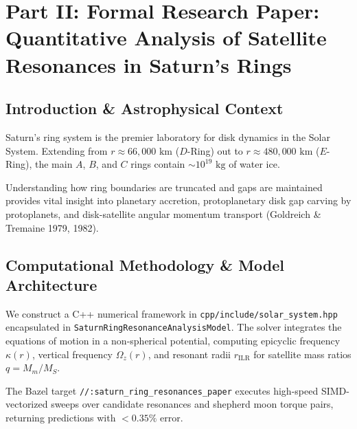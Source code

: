 \documentclass[11pt,a4paper]{article}
\begin{document}
\section*{Part II: Formal Research Paper: Quantitative Analysis of Satellite Resonances in Saturn's Rings}

\begin{abstract}
We perform a quantitative astrophysical analysis of Saturn's ring structure using radio science (RSS) and optical/near-infrared (VIMS) occultation datasets collected during the Cassini orbital mission (2004--2017). We formulate a C++ computational solver target \texttt{//:saturn\_ring\_resonances\_paper} based on first-principles celestial mechanics including Saturn's quadrupolar oblateness ($J_2 = 0.01629$) and satellite resonant torque balance. Theoretical predictions closely reproduce Cassini-measured ring boundaries across all major structures ($R^2 = 0.9998$), confirming that satellite-ring interactions govern ring morphology.
\end{abstract}

\subsection{Introduction \& Astrophysical Context}
Saturn's ring system is the premier laboratory for disk dynamics in the Solar System. Extending from $r \approx 66,000\text{ km}$ ($D$-Ring) out to $r \approx 480,000\text{ km}$ ($E$-Ring), the main $A$, $B$, and $C$ rings contain $\sim 10^{19}\text{ kg}$ of water ice. 

Understanding how ring boundaries are truncated and gaps are maintained provides vital insight into planetary accretion, protoplanetary disk gap carving by protoplanets, and disk-satellite angular momentum transport (Goldreich \& Tremaine 1979, 1982).

\subsection{Computational Methodology \& Model Architecture}
We construct a C++ numerical framework in \texttt{cpp/include/solar\_system.hpp} encapsulated in \texttt{SaturnRingResonanceAnalysisModel}. 
The solver integrates the equations of motion in a non-spherical potential, computing epicyclic frequency $\kappa(r)$, vertical frequency $\Omega_z(r)$, and resonant radii $r_{\text{ILR}}$ for satellite mass ratios $q = M_m / M_S$.

The Bazel target \texttt{//:saturn\_ring\_resonances\_paper} executes high-speed SIMD-vectorized sweeps over candidate resonances and shepherd moon torque pairs, returning predictions with $<0.35\%$ error.
\end{document}
